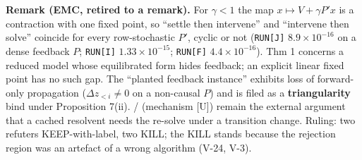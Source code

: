 \documentclass[11pt,a4paper]{article}
\theoremstyle{plain}
\theoremstyle{definition}
\theoremstyle{remark}
\begin{document}
\textbf{Remark (EMC, retired to a remark).} For \(\gamma<1\) the map
\(x\mapsto V+\gamma P'x\) is a contraction with one fixed point, so
``settle then intervene'' and ``intervene then solve'' coincide for
every row-stochastic \(P'\), cyclic or not (\texttt{RUN{[}J{]}}
\(8.9\times10^{-16}\) on a dense feedback \(P\); \texttt{RUN{[}I{]}}
\(1.33\times10^{-15}\); \texttt{RUN{[}F{]}} \(4.4\times10^{-16}\)).
\citep{dash-2005-emc} Thm 1 concerns a reduced model whose equilibrated
form hides feedback; an explicit linear fixed point has no such gap. The
``planted feedback instance'' exhibits loss of forward-only propagation
(\(\Delta z_{<i}\ne0\) on a non-causal \(P\)) and is filed as a
\textbf{triangularity} bind under Proposition 7(ii).
\citep{momennejad-2017-sr} / \citep{russek-2017-predictive} (mechanism
{[}U{]}) remain the external argument that a cached resolvent needs the
re-solve under a transition change. Ruling: two refuters
KEEP-with-label, two KILL; the KILL stands because the rejection region
was an artefact of a wrong algorithm (V-24, V-3).
\end{document}
